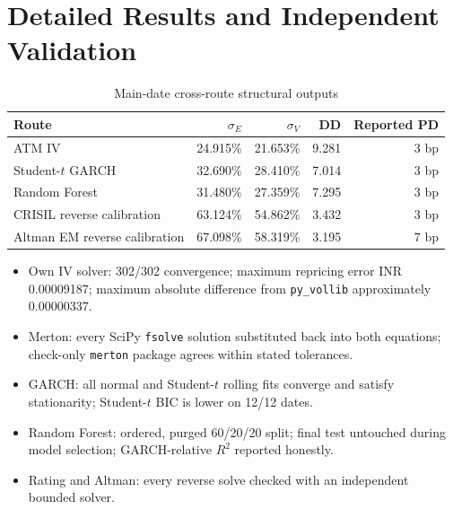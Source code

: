 \documentclass[10pt,a4paper]{article}
\newcommand{\sigE}{\sigma_E}
\newcommand{\sigV}{\sigma_V}
\begin{document}
\section{Detailed Results and Independent Validation}\label{app:results}
\small
\begin{table}[H]
\centering
\caption{Main-date cross-route structural outputs}
\begin{tabular}{lrrrr}
\toprule Route & $\sigE$ & $\sigV$ & DD & Reported PD\\
\midrule
ATM IV & 24.915\% & 21.653\% & 9.281 & 3 bp\\
Student-$t$ GARCH & 32.690\% & 28.410\% & 7.014 & 3 bp\\
Random Forest & 31.480\% & 27.359\% & 7.295 & 3 bp\\
CRISIL reverse calibration & 63.124\% & 54.862\% & 3.432 & 3 bp\\
Altman EM reverse calibration & 67.098\% & 58.319\% & 3.195 & 7 bp\\
\bottomrule
\end{tabular}
\end{table}

\begin{itemize}
\item Own IV solver: 302/302 convergence; maximum repricing error INR 0.00009187; maximum absolute difference from \texttt{py\_vollib} approximately 0.00000337.
\item Merton: every SciPy \texttt{fsolve} solution substituted back into both equations; check-only \texttt{merton} package agrees within stated tolerances.
\item GARCH: all normal and Student-$t$ rolling fits converge and satisfy stationarity; Student-$t$ BIC is lower on 12/12 dates.
\item Random Forest: ordered, purged 60/20/20 split; final test untouched during model selection; GARCH-relative $R^2$ reported honestly.
\item Rating and Altman: every reverse solve checked with an independent bounded solver.
\end{itemize}
\end{document}
